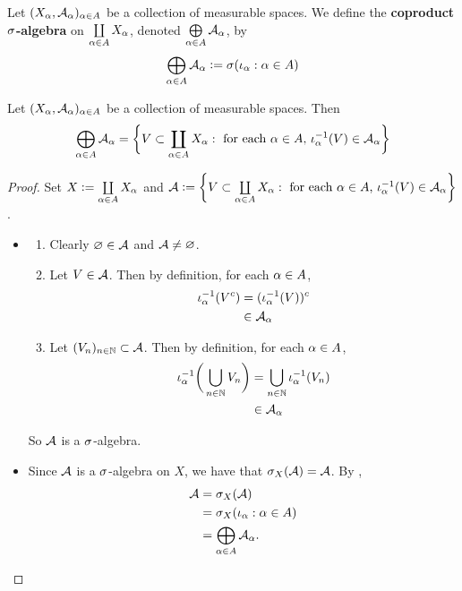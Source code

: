 \documentclass{book}
\begin{document}
	\begin{defn} 
		Let $(X_{\alpha}, \mathcal{A}_{\alpha})_{\alpha \in A}$ be a collection of measurable spaces. We define the \textbf{coproduct $\sigma$-algebra} on $\coprod\limits_{\alpha \in A}X_{\alpha}$, denoted $\bigoplus\limits_{\alpha \in A} \mathcal{A}_{\alpha}$, by 
		$$\bigoplus\limits_{\alpha \in A} \mathcal{A}_{\alpha} \vcentcolon= \sigma (\iota_{\alpha}: \alpha \in A)$$
	\end{defn}

	\begin{ex} 
		Let $(X_{\alpha}, \mathcal{A}_{\alpha})_{\alpha \in A}$ be a collection of measurable spaces. Then $$\bigoplus\limits_{\alpha \in A} \mathcal{A}_{\alpha} = \bigg \{V \subset \coprod_{\alpha \in A}  X_{\alpha}: \text{ for each $\alpha \in A$, $\iota_{\alpha}^{-1}(V) \in \mathcal{A}_{\alpha}$} \bigg \}$$
	\end{ex}

	\begin{proof}
		Set $X \vcentcolon= \coprod\limits_{\alpha \in A}  X_{\alpha}$ and $\mathcal{A} \vcentcolon= \bigg \{V \subset \coprod\limits_{\alpha \in A} X_{\alpha}: \text{ for each $\alpha \in A$, $\iota_{\alpha}^{-1}(V) \in \mathcal{A}_{\alpha}$} \bigg \}$.
		\begin{itemize}
			\item \begin{enumerate}
				\item Clearly $\varnothing \in \mathcal{A}$ and $\mathcal{A} \neq \varnothing$.
				\item Let $V \in \mathcal{A}$. Then by definition, for each $\alpha \in A$,
				\begin{align*}
					\iota_{\alpha}^{-1}(V^c)
					& = ( \iota_{\alpha}^{-1}(V))^c \\
					& \in \mathcal{A}_{\alpha}
				\end{align*}
				\item Let $(V_n)_{n \in \mathbb{N}} \subset \mathcal{A}$. Then by definition, for each $\alpha \in A$,
				\begin{align*}
					\iota_{\alpha}^{-1}\bigg( \bigcup_{n \in \mathbb{N}} V_n \bigg)
					& = \bigcup_{n \in \mathbb{N}} \iota_{\alpha}^{-1}(V_n)\\
					& \in \mathcal{A}_{\alpha}
				\end{align*}
			\end{enumerate}
			So $\mathcal{A}$ is a $\sigma$-algebra.
			\item Since $\mathcal{A}$ is a $\sigma$-algebra on $X$, we have that $\sigma_X(\mathcal{A}) = \mathcal{A}$. By , 
			\begin{align*}
				\mathcal{A}
				& = \sigma_X(\mathcal{A}) \\
				& = \sigma_X(\iota_{\alpha}: \alpha \in A) \\
				& = \bigoplus\limits_{\alpha \in A} \mathcal{A}_{\alpha}.
			\end{align*}
		\end{itemize}
	\end{proof}
\end{document}
